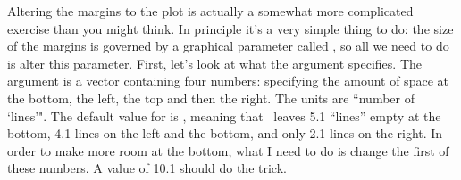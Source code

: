 Altering the margins to the plot is actually a somewhat more complicated exercise than you might think. In principle it's a very simple thing to do: the size of the margins is governed by a graphical parameter called , so all we need to do is alter this parameter. First, let's look at what the  argument specifies. The  argument is a vector containing four numbers: specifying the amount of space at the bottom, the left, the top and then the right. The units are ``number of `lines'". The default value for  is , meaning that \R\ leaves 5.1 ``lines'' empty at the bottom, 4.1 lines on the left and the bottom, and only 2.1 lines on the right. In order to make more room at the bottom, what I need to do is change the first of these numbers. A value of 10.1 should do the trick. 


